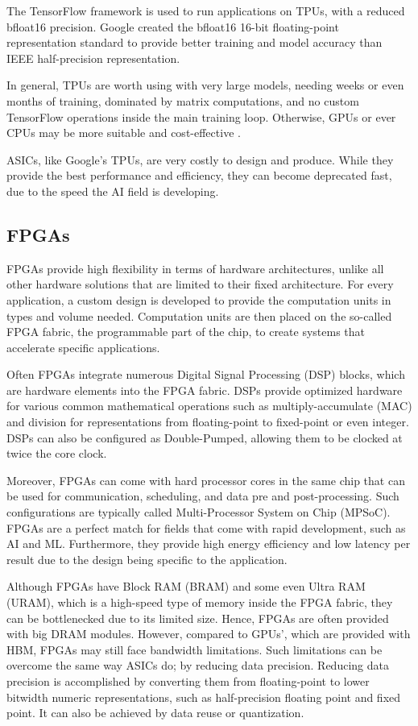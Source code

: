 The TensorFlow framework is used to run applications on TPUs, with a reduced bfloat16 precision. Google created the bfloat16 16-bit floating-point representation standard to provide better training and model accuracy than IEEE half-precision representation.

In general, TPUs are worth using with very large models, needing weeks or even months of training, dominated by matrix computations, and no custom TensorFlow operations inside the main training loop. Otherwise, GPUs or ever CPUs may be more suitable and cost-effective \cite{Cloud-Tensor-Processing-Units}.

ASICs, like Google's TPUs, are very costly to design and produce. While they provide the best performance and efficiency, they can become deprecated fast, due to the speed the AI field is developing.

\subsection{FPGAs}
FPGAs provide high flexibility in terms of hardware architectures, unlike all other hardware solutions that are limited to their fixed architecture. For every application, a custom design is developed to provide the computation units in types and volume needed. Computation units are then placed on the so-called FPGA fabric, the programmable part of the chip, to create systems that accelerate specific applications.

Often FPGAs integrate numerous Digital Signal Processing (DSP) blocks, which are hardware elements into the FPGA fabric. DSPs provide optimized hardware for various common mathematical operations such as multiply-accumulate (MAC) and division for representations from floating-point to fixed-point or even integer. DSPs can also be configured as Double-Pumped, allowing them to be clocked at twice the core clock.

Moreover, FPGAs can come with hard processor cores in the same chip that can be used for communication, scheduling, and data pre and post-processing. Such configurations are typically called Multi-Processor System on Chip (MPSoC). FPGAs are a perfect match for fields that come with rapid development, such as AI and ML. Furthermore, they provide high energy efficiency and low latency per result due to the design being specific to the application.

Although FPGAs have Block RAM (BRAM) and some even Ultra RAM (URAM), which is a high-speed type of memory inside the FPGA fabric, they can be bottlenecked due to its limited size. Hence, FPGAs are often provided with big DRAM modules. However, compared to GPUs', which are provided with HBM, FPGAs may still face bandwidth limitations. Such limitations can be overcome the same way ASICs do; by reducing data precision. Reducing data precision is accomplished by converting them from floating-point to lower bitwidth numeric representations, such as half-precision floating point and fixed point. It can also be achieved by data reuse or quantization.

